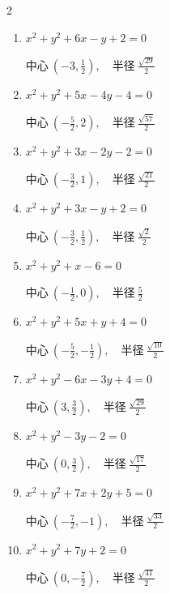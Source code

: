 \begin{multicols}{2}
\begin{enumerate}
        $\displaystyle 中心\: \left(\frac{1}{2},-\frac{7}{2}\right), \quad 半径 \ \frac{\sqrt{62}}{2}$

  \item $x^{2}+y^{2}+6x-y+2=0$

        $\displaystyle 中心\: \left(-3,\frac{1}{2}\right), \quad 半径 \ \frac{\sqrt{29}}{2}$

  \item $x^{2}+y^{2}+5x-4y-4=0$

        $\displaystyle 中心\: \left(-\frac{5}{2},2\right), \quad 半径 \ \frac{\sqrt{57}}{2}$

  \item $x^{2}+y^{2}+3x-2y-2=0$

        $\displaystyle 中心\: \left(-\frac{3}{2},1\right), \quad 半径 \ \frac{\sqrt{21}}{2}$

\columnbreak %

\resetques

  \item $x^{2}+y^{2}+3x-y+2=0$

        $\displaystyle 中心\: \left(-\frac{3}{2},\frac{1}{2}\right), \quad 半径 \ \frac{\sqrt{2}}{2}$

  \item $x^{2}+y^{2}+x-6=0$

        $\displaystyle 中心\: \left(-\frac{1}{2},0\right), \quad 半径 \ \frac{5}{2}$

  \item $x^{2}+y^{2}+5x+y+4=0$

        $\displaystyle 中心\: \left(-\frac{5}{2},-\frac{1}{2}\right), \quad 半径 \ \frac{\sqrt{10}}{2}$

  \item $x^{2}+y^{2}-6x-3y+4=0$

        $\displaystyle 中心\: \left(3,\frac{3}{2}\right), \quad 半径 \ \frac{\sqrt{29}}{2}$

  \item $x^{2}+y^{2}-3y-2=0$

        $\displaystyle 中心\: \left(0,\frac{3}{2}\right), \quad 半径 \ \frac{\sqrt{17}}{2}$

  \item $x^{2}+y^{2}+7x+2y+5=0$

        $\displaystyle 中心\: \left(-\frac{7}{2},-1\right), \quad 半径 \ \frac{\sqrt{33}}{2}$

  \item $x^{2}+y^{2}+7y+2=0$

        $\displaystyle 中心\: \left(0,-\frac{7}{2}\right), \quad 半径 \ \frac{\sqrt{41}}{2}$


\end{enumerate}
\end{multicols}
